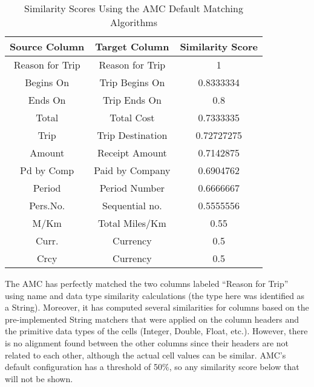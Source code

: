 \begin{table}[ht]
\centering
\begin{tabular}{|c|c|c|}
\hline
{\bf Source Column} & {\bf Target Column} & {\bf Similarity Score} \\ \hline
Reason for Trip                & Reason for Trip                & 1                                 \\ \hline
Begins On                      & Trip Begins On                 & 0.8333334                         \\ \hline
Ends On                        & Trip Ends On                   & 0.8                               \\ \hline
Total                          & Total Cost                     & 0.7333335                         \\ \hline
Trip                           & Trip Destination               & 0.72727275                        \\ \hline
Amount                         & Receipt Amount                 & 0.7142875                         \\ \hline
Pd by Comp                     & Paid by Company                & 0.6904762                         \\ \hline
Period                         & Period Number                  & 0.6666667                         \\ \hline
Pers.No.                       & Sequential no.                 & 0.5555556                         \\ \hline
M/Km                           & Total Miles/Km                 & 0.55                              \\ \hline
Curr.                          & Currency                       & 0.5                               \\ \hline
Crcy                           & Currency                       & 0.5                               \\ \hline
\end{tabular}
\caption{Similarity Scores Using the AMC Default Matching Algorithms}
\label{tab:Similarity_Scores_Using_the_AMC_Default_Matching_Algorithms}
\end{table}

The AMC has perfectly matched the two columns labeled ``Reason for Trip'' using name and data type similarity calculations (the type here was identified as a String). Moreover, it has computed several similarities for columns based on the pre-implemented String matchers that were applied on the column headers and the primitive data types of the cells (Integer, Double, Float, etc.). However, there is no alignment found between the other columns since their headers are not related to each other, although the actual cell values can be similar. AMC's default configuration has a threshold of 50\%, so any similarity score below that will not be shown.

